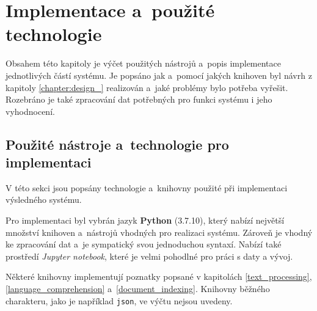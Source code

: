 \chapter{Implementace a~použité technologie}
\label{chapter:implementace}
Obsahem této kapitoly je výčet použitých nástrojů a~popis implementace jednotlivých částí systému. Je popsáno jak a~pomocí jakých knihoven byl návrh z kapitoly \ref{chapter:design_} realizován a~jaké problémy bylo potřeba vyřešit. Rozebráno je také zpracování dat potřebných pro funkci systému i jeho vyhodnocení.

\section{Použité nástroje a~technologie pro implementaci}
\label{pouzite_nastroje}
V této sekci jsou popsány technologie a~knihovny použité při implementaci výsledného systému.\par
Pro implementaci byl vybrán jazyk \textbf{Python} (3.7.10), který nabízí největší množství knihoven a~nástrojů vhodných pro realizaci systému. Zároveň je vhodný ke zpracování dat a~je sympatický svou jednoduchou syntaxí. Nabízí také prostředí \emph{Jupyter notebook}, které je velmi pohodlné pro práci s daty a vývoj.\par
Některé knihovny implementují poznatky popsané v kapitolách \ref{text_processing}, \ref{language_comprehension} a~\ref{document_indexing}. Knihovny běžného charakteru, jako je například \texttt{json}, ve výčtu nejsou uvedeny.

